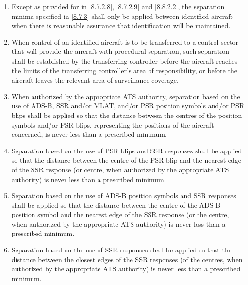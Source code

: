 
\begin{enumerate}
    \item Except as provided for in \ref{8.7.2.8}, \ref{8.7.2.9} and \ref{8.8.2.2}, the separation minima specified in \ref{8.7.3} shall only be applied between identified aircraft when there is reasonable assurance that identification will be maintained.
    \item When control of an identified aircraft is to be transferred to a control sector that will provide the aircraft with procedural separation, such separation shall be established by the transferring controller before the aircraft reaches the limits of the transferring controller's area of responsibility, or before the aircraft leaves the relevant area of surveillance coverage.
    \item When authorized by the appropriate ATS authority, separation based on the use of ADS-B, SSR and/or MLAT, and/or PSR position symbols and/or PSR blips shall be applied so that the distance between the centres of the position symbols and/or PSR blips, representing the positions of the aircraft concerned, is never less than a prescribed minimum.
    \item Separation based on the use of PSR blips and SSR responses shall be applied so that the distance between the centre of the PSR blip and the nearest edge of the SSR response (or centre, when authorized by the appropriate ATS authority) is never less than a prescribed minimum.
    \item Separation based on the use of ADS-B position symbols and SSR responses shall be applied so that the distance between the centre of the ADS-B position symbol and the nearest edge of the SSR response (or the centre, when authorized by the appropriate ATS authority) is never less than a prescribed minimum.
    \item Separation based on the use of SSR responses shall be applied so that the distance between the closest edges of the SSR responses (of the centres, when authorized by the appropriate ATS authority) is never less than a prescribed minimum.

\end{enumerate}
